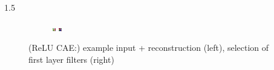 \documentclass[final]{beamer}
\newlength{\onecolwid}
\newlength{\threecolwid}
\begin{document}
\begin{frame}[t]
\begin{columns}[t]
\begin{column}{\threecolwid}
\begin{alertblock}
\begin{columns}[t]
\begin{column}{1.5\onecolwid}
\begin{figure}
\begin{subfigure}{0.4\linewidth}
					\includegraphics[width=0.1\linewidth]{graphics/reconstructions/cifar/relu/relu_filter_07.png} \hspace{0.05\linewidth}
					\includegraphics[width=0.1\linewidth]{graphics/reconstructions/cifar/relu/relu_filter_08.png} 


				\end{subfigure}

			\caption{(ReLU CAE:) example input + reconstruction (left), selection of first layer filters (right) }
			\label{fig:relu_cae}

			\end{figure}
		
		\end{column}



\end{columns}

\end{alertblock}


\end{column}
\end{columns} %


\end{frame} %
\end{document}
